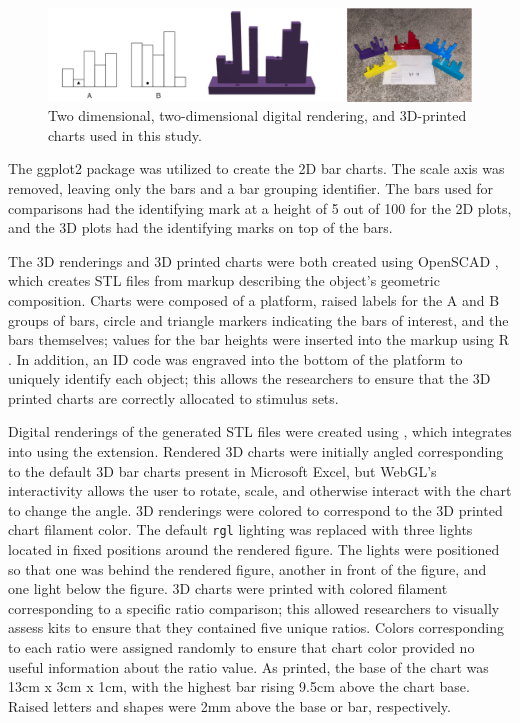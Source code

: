 \documentclass[letterpaper,inpress,dvipsnames]{jdsart}
\begin{document}
\begin{figure}
\includegraphics[width=1\linewidth]{_images/plot-types} \caption{Two dimensional, two-dimensional digital rendering, and 3D-printed charts used in this study.}\label{fig:plotTypes}
\end{figure}

The ggplot2 \citep{ggplot2} package was utilized to create the 2D bar charts.
The scale axis was removed, leaving only the bars and a bar grouping identifier.
The bars used for comparisons had the identifying mark at a height of 5 out of 100 for the 2D plots, and the 3D plots had the identifying marks on top of the bars.

The 3D renderings and 3D printed charts were both created using OpenSCAD \citep{kintelOpenSCADDocumentation2023}, which creates STL files from markup describing the object's geometric composition.
Charts were composed of a platform, raised labels for the A and B groups of bars, circle and triangle markers indicating the bars of interest, and the bars themselves; values for the bar heights were inserted into the markup using R \citep{R}.
In addition, an ID code was engraved into the bottom of the platform to uniquely identify each object; this allows the researchers to ensure that the 3D printed charts are correctly allocated to stimulus sets.

Digital renderings of the generated STL files were created using \citet{rgl}, which integrates into \citet{shiny} using the \citet{mozillafoundationWebGL2D3D2023} extension.
Rendered 3D charts were initially angled corresponding to the default 3D bar charts present in Microsoft Excel, but WebGL's interactivity allows the user to rotate, scale, and otherwise interact with the chart to change the angle. 3D renderings were colored to correspond to the 3D printed chart filament color.
The default \texttt{rgl} lighting was replaced with three lights located in fixed positions around the rendered figure.
The lights were positioned so that one was behind the rendered figure, another in front of the figure, and one light below the figure.
3D charts were printed with colored filament corresponding to a specific ratio comparison; this allowed researchers to visually assess kits to ensure that they contained five unique ratios.
Colors corresponding to each ratio were assigned randomly to ensure that chart color provided no useful information about the ratio value.
As printed, the base of the chart was 13cm x 3cm x 1cm, with the highest bar rising 9.5cm above the chart base.
Raised letters and shapes were 2mm above the base or bar, respectively.
\end{document}
